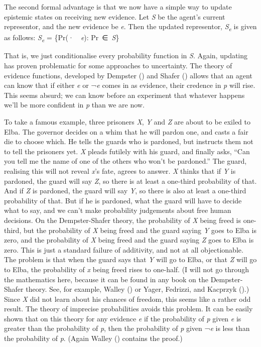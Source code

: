 \documentclass[
  11pt,
  letterpaper,
  DIV=11,
  numbers=noendperiod,
  twoside]{scrartcl}
\begin{document}
The second formal advantage is that we now have a simple way to update
epistemic states on receiving new evidence. Let \emph{S} be the agent's
current representor, and the new evidence be \emph{e}. Then the updated
representor, \emph{S\textsubscript{e}} is given as follows:
\emph{S\textsubscript{e}} = \{Pr(·~\textbar~\emph{e}): Pr~∈~\emph{S}\}

That is, we just conditionalise every probability function in \emph{S}.
Again, updating has proven problematic for some approaches to
uncertainty. The theory of evidence functions, developed by Dempster
() and Shafer
() allows that an agent can know that if
either \emph{e} or ¬\emph{e} comes in as evidence, their credence in
\emph{p} will rise. This seems absurd; we can know before an experiment
that whatever happens we'll be more confident in \emph{p} than we are
now.

To take a famous example, three prisoners \emph{X}, \emph{Y} and
\emph{Z} are about to be exiled to Elba. The governor decides on a whim
that he will pardon one, and casts a fair die to choose which. He tells
the guards who is pardoned, but instructs them not to tell the prisoners
yet. \emph{X} pleads futilely with his guard, and finally asks, ``Can
you tell me the name of one of the others who won't be pardoned.'' The
guard, realising this will not reveal \emph{x}'s fate, agrees to answer.
\emph{X} thinks that if \emph{Y} is pardoned, the guard will say
\emph{Z}, so there is at least a one-third probability of that. And if
\emph{Z} is pardoned, the guard will say \emph{Y}, so there is also at
least a one-third probability of that. But if he is pardoned, what the
guard will have to decide what to say, and we can't make probability
judgements about free human decisions. On the Dempster-Shafer theory,
the probability of \emph{X} being freed is one-third, but the
probability of \emph{X} being freed and the guard saying \emph{Y} goes
to Elba is zero, and the probability of \emph{X} being freed and the
guard saying \emph{Z} goes to Elba is zero. This is just a standard
failure of additivity, and not at all objectionable. The problem is that
when the guard says that \emph{Y} will go to Elba, or that \emph{Z} will
go to Elba, the probability of \emph{x} being freed rises to one-half.
(I will not go through the mathematics here, because it can be found in
any book on the Dempster-Shafer theory. See, for example, Walley
() or Yager, Fedrizzi, and Kacprzyk
().) Since \emph{X} did not learn about
his chances of freedom, this seems like a rather odd result. The theory
of imprecise probabilities avoids this problem. It can be easily shown
that on this theory for any evidence \emph{e} if the probability of
\emph{p} given \emph{e} is greater than the probability of \emph{p},
then the probability of \emph{p} given ¬\emph{e} is less than the
probability of \emph{p}. (Again Walley ()
contains the proof.)
\end{document}
